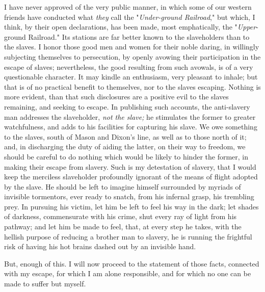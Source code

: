 I have never approved of the very public manner, in which some of our
western friends have conducted what \emph{they} call the
"\emph{Under-ground Railroad}," but which, I think, by their open
declarations, has been made, most emphatically, the "\emph{Upper}-ground
Railroad." Its stations are far better known to the slaveholders than to
the slaves. I honor those good men and women for their noble daring, in
willingly {\protect\hypertarget{324}{}{}}subjecting themselves to
persecution, by openly avowing their participation in the escape of
slaves; nevertheless, the good resulting from such avowals, is of a very
questionable character. It may kindle an enthusiasm, very pleasant to
inhale; but that is of no practical benefit to themselves, nor to the
slaves escaping. Nothing is more evident, than that such disclosures are
a positive evil to the slaves remaining, and seeking to escape. In
publishing such accounts, the anti-slavery man addresses the
slaveholder, \emph{not the slave;} he stimulates the former to greater
watchfulness, and adds to his facilities for capturing his slave. We owe
something to the slaves, south of Mason and Dixon's line, as well as to
those north of it; and, in discharging the duty of aiding the latter, on
their way to freedom, we should be careful to do nothing which would be
likely to hinder the former, in making their escape from slavery. Such
is my detestation of slavery, that I would keep the merciless
slaveholder profoundly ignorant of the means of flight adopted by the
slave. He should be left to imagine himself surrounded by myriads of
invisible tormentors, ever ready to snatch, from his infernal grasp, his
trembling prey. In pursuing his victim, let him be left to feel his way
in the dark; let shades of darkness, commensurate with his crime, shut
every ray of light from his pathway; and let him be made to feel, that,
at every step he takes, with the hellish purpose of reducing a brother
man to slavery, he is running the frightful risk of having his hot
brains dashed out by an invisible hand.

But, enough of this. I will now proceed to the
{\protect\hypertarget{325}{}{}}statement of those facts, connected with
my escape, for which I am alone responsible, and for which no one can be
made to suffer but myself.

